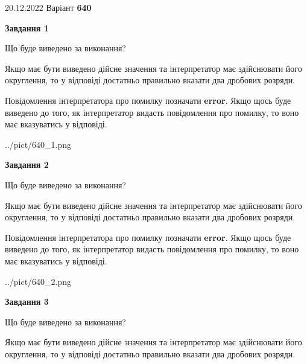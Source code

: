 \documentclass[12pt, ukrainian]{article}
\begin{document}
{20.12.2022 Варіант \No \textbf { 640 }\par}
{
\begin {Large}

{\begin {center}\textbf{Завдання 1}\end {center}}\par
Що буде виведено за виконання? \par

Якщо має бути виведено дійсне значення та інтерпретатор має здійснювати його округлення, 
то у відповіді достатньо правильно вказати два дробових розряди.

Повідомлення інтерпретатора про помилку позначати \textbf{error}.
Якщо щось буде виведено до того, як інтерпретатор видасть повідомлення про помилку, 
то воно має вказуватись у відповіді. \par

\begin{center}
	{../pict/640_1.png}
\end{center}
\newpage

{\begin {center}\textbf{Завдання 2}\end {center}}\par
Що буде виведено за виконання? \par

Якщо має бути виведено дійсне значення та інтерпретатор має здійснювати його округлення, 
то у відповіді достатньо правильно вказати два дробових розряди.

Повідомлення інтерпретатора про помилку позначати \textbf{error}.
Якщо щось буде виведено до того, як інтерпретатор видасть повідомлення про помилку, 
то воно має вказуватись у відповіді. \par

\begin{center}
	{../pict/640_2.png}
\end{center}
\newpage

{\begin {center}\textbf{Завдання 3}\end {center}}\par
Що буде виведено за виконання? \par

Якщо має бути виведено дійсне значення та інтерпретатор має здійснювати його округлення, 
то у відповіді достатньо правильно вказати два дробових розряди.


\end{Large}}
\end{document}
